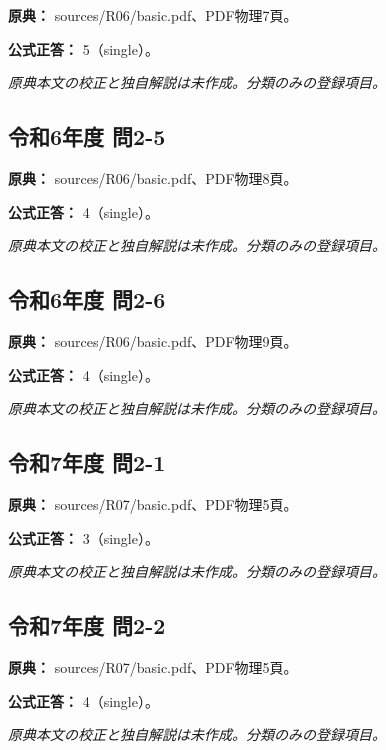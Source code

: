 \noindent\textbf{原典：} sources/R06/basic.pdf、PDF物理7頁。

\textbf{公式正答：} 5（single）。

\par\textit{原典本文の校正と独自解説は未作成。分類のみの登録項目。}

\subsection{令和6年度 問2-5}
\label{q:r06-reg-basic-2-5}

\noindent\textbf{原典：} sources/R06/basic.pdf、PDF物理8頁。

\textbf{公式正答：} 4（single）。

\par\textit{原典本文の校正と独自解説は未作成。分類のみの登録項目。}

\subsection{令和6年度 問2-6}
\label{q:r06-reg-basic-2-6}

\noindent\textbf{原典：} sources/R06/basic.pdf、PDF物理9頁。

\textbf{公式正答：} 4（single）。

\par\textit{原典本文の校正と独自解説は未作成。分類のみの登録項目。}

\subsection{令和7年度 問2-1}
\label{q:r07-reg-basic-2-1}

\noindent\textbf{原典：} sources/R07/basic.pdf、PDF物理5頁。

\textbf{公式正答：} 3（single）。

\par\textit{原典本文の校正と独自解説は未作成。分類のみの登録項目。}

\subsection{令和7年度 問2-2}
\label{q:r07-reg-basic-2-2}

\noindent\textbf{原典：} sources/R07/basic.pdf、PDF物理5頁。

\textbf{公式正答：} 4（single）。

\par\textit{原典本文の校正と独自解説は未作成。分類のみの登録項目。}

